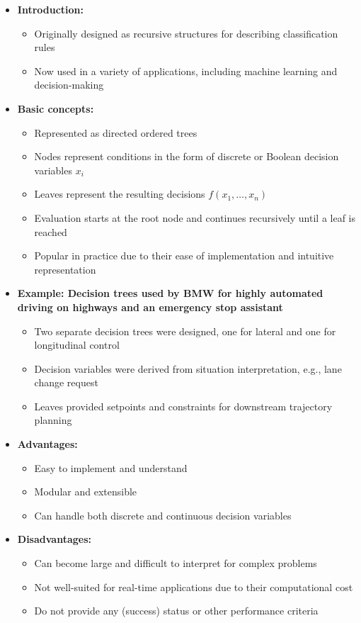 \begin{itemize}
\item \textbf{Introduction:}
\begin{itemize}
    \item Originally designed as recursive structures for describing classification rules
    \item Now used in a variety of applications, including machine learning and decision-making
\end{itemize}

\item \textbf{Basic concepts:}
\begin{itemize}
    \item Represented as directed ordered trees
    \item Nodes represent conditions in the form of discrete or Boolean decision variables $x_i$
    \item Leaves represent the resulting decisions $f(x_1, \ldots, x_n)$
    \item Evaluation starts at the root node and continues recursively until a leaf is reached
    \item Popular in practice due to their ease of implementation and intuitive representation
\end{itemize}

\item \textbf{Example: Decision trees used by BMW for highly automated driving on highways and an emergency stop assistant}
\begin{itemize}
    \item Two separate decision trees were designed, one for lateral and one for longitudinal control
    \item Decision variables were derived from situation interpretation, e.g., lane change request
    \item Leaves provided setpoints and constraints for downstream trajectory planning
\end{itemize}

\item \textbf{Advantages:}
\begin{itemize}
    \item Easy to implement and understand
    \item Modular and extensible
    \item Can handle both discrete and continuous decision variables
\end{itemize}

\item \textbf{Disadvantages:}
\begin{itemize}
    \item Can become large and difficult to interpret for complex problems
    \item Not well-suited for real-time applications due to their computational cost
    \item Do not provide any (success) status or other performance criteria
\end{itemize}
\end{itemize}

